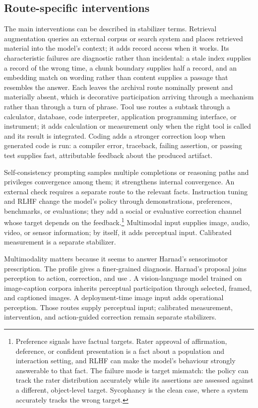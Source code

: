 \documentclass[12pt]{article}
\begin{document}
\subsection{Route-specific interventions}

The main interventions can be described in stabilizer terms. Retrieval augmentation
queries an external corpus or search system and places retrieved material into the
model's context; it adds record access when it works. Its characteristic failures are
diagnostic rather than incidental: a stale index supplies a record of the wrong time, a
chunk boundary supplies half a record, and an embedding match on wording rather than
content supplies a passage that resembles the answer. Each leaves the archival route
nominally present and materially absent, which is decorative participation arriving
through a mechanism rather than through a turn of phrase. Tool use routes a subtask
through a calculator, database, code interpreter, application programming interface, or
instrument; it adds calculation or measurement only when the right tool is called and its
result is integrated. Coding adds a stronger correction loop when generated code is run:
a compiler error, traceback, failing assertion, or passing test supplies fast,
attributable feedback about the produced artifact.

Self-consistency prompting samples multiple completions or reasoning paths and privileges
convergence among them; it strengthens internal convergence. An external check requires a
separate route to the relevant facts.
Instruction tuning and RLHF change the model's policy through demonstrations,
preferences, benchmarks, or evaluations; they add a social or evaluative correction
channel whose target depends on the feedback.\footnote{Preference signals have factual
targets. Rater approval of affirmation, deference, or confident presentation is a fact
about a population and interaction setting, and RLHF can make the model's behaviour
strongly answerable to that fact. The failure mode is target mismatch: the policy can
track the rater distribution accurately while its assertions are assessed against a
different, object-level target. Sycophancy is the clean case, where a system accurately
tracks the wrong target.} Multimodal input supplies image, audio, video, or sensor
information; by itself, it adds perceptual input. Calibrated measurement is a separate
stabilizer.

Multimodality matters because it seems to answer Harnad's sensorimotor prescription. The
profile gives a finer-grained diagnosis. Harnad's proposal joins perception to action,
correction, and use
\citep{harnad_1990_symbol_grounding_problem}. A vision-language model trained on
image-caption corpora inherits perceptual participation through selected, framed, and
captioned images. A deployment-time image input adds operational perception. Those
routes supply perceptual input; calibrated measurement, intervention, and action-guided
correction remain separate stabilizers.
\end{document}
